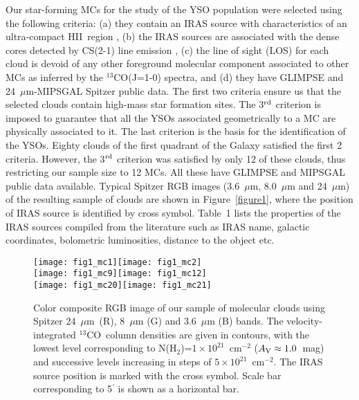 \documentclass[iop]{emulateapj}
\newcommand{\mipslam}{24~$\mu$m}
\newcommand{\hii}{H{\small II}}
\newcommand{\co}{$^{13}$CO}
\begin{document}
Our star-forming MCs for the study of the YSO population were selected using the 
following criteria:
(a) they contain an IRAS source with characteristics of an
ultra-compact \hii\ region \citep{wood+89},
(b) the IRAS sources are associated with the dense cores detected by CS(2-1) line emission \citet{bronfman+96},
(c) the line of sight (LOS) for each cloud is devoid of any other
foreground molecular component associated to other MCs as
inferred by the $^{13}$CO(J=1-0) spectra,
and (d) they have GLIMPSE \citep{churchwell+09} and 
\mipslam-MIPSGAL \citep{rieke+04} Spitzer public data.
%
The first two criteria ensure us that the selected clouds contain
high-mass star formation sites. The 3$^{\rm rd}$ criterion
is imposed to guarantee that all the YSOs associated geometrically to a
MC are physically associated to it. The last criterion
is the basis for the identification of the YSOs. Eighty clouds
of the first quadrant of the Galaxy satisfied the first 2 criteria.
However, the 3$^{\rm rd}$ criterion was satisfied by only 12 of these
clouds, thus restricting our sample size to 12 MCs. All these have GLIMPSE
and MIPSGAL public data available. Typical Spitzer RGB images 
(3.6~$\mu$m, 8.0~$\mu$m and \mipslam) of the resulting sample of clouds 
are shown in Figure~\ref{figure1}, where the position of IRAS source is identified 
by cross symbol. Table~1 lists the properties of the IRAS sources compiled 
from the literature such as IRAS name, galactic coordinates, bolometric 
luminosities, distance to the object etc.

\begin{figure*}
\texttt{[image: fig1\_mc1]}\hspace*{3mm}\texttt{[image: fig1\_mc2]}\\
\vspace*{2mm}
\texttt{[image: fig1\_mc9]}\hspace*{3mm}\texttt{[image: fig1\_mc12]}\\
\texttt{[image: fig1\_mc20]}\hspace*{3mm}\texttt{[image: fig1\_mc21]}
\caption{Color composite RGB image of our sample of molecular clouds using Spitzer 
\mipslam\ (R), 8~$\mu$m (G) and 3.6~$\mu$m (B) bands. The velocity-integrated \co\ 
column densities are given in contours, with the lowest level corresponding to
N(H$_2$)=$1\times10^{21}$~cm$^{-2}$ ($A_{\rm V}\approx 1.0$~mag) and successive 
levels increasing in steps of $5\times10^{21}$~cm$^{-2}$. The IRAS source position 
is marked with the cross symbol. Scale bar corresponding to 5$^\prime$ is
shown as a horizontal bar.}
\end{figure*}
\end{document}

